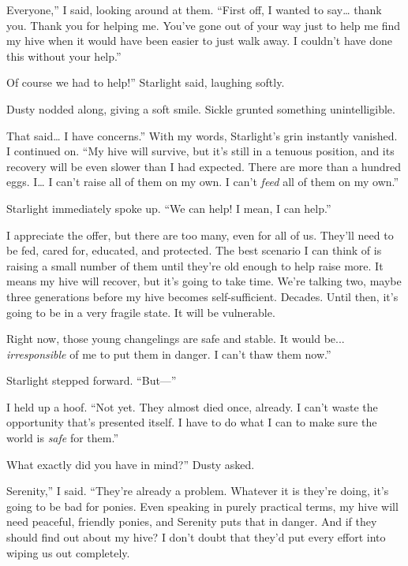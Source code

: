 \leavevmode{}Everyone,” I said, looking around at them. “First off, I wanted to say… thank you. Thank you for helping me. You’ve gone out of your way just to help me find my hive when it would have been easier to just walk away. I couldn’t have done this without your help.”

\leavevmode{}Of course we had to help!” Starlight said, laughing softly.

Dusty nodded along, giving a soft smile. Sickle grunted something unintelligible.

\leavevmode{}That said… I have concerns.” With my words, Starlight’s grin instantly vanished. I continued on. “My hive will survive, but it’s still in a tenuous position, and its recovery will be even slower than I had expected. There are more than a hundred eggs. I… I can’t raise all of them on my own. I can’t \textit{feed} all of them on my own.”

Starlight immediately spoke up. “We can help! I mean, I can help.”

\leavevmode{}I appreciate the offer, but there are too many, even for all of us. They’ll need to be fed, cared for, educated, and protected. The best scenario I can think of is raising a small number of them until they’re old enough to help raise more. It means my hive will recover, but it’s going to take time. We’re talking two, maybe three generations before my hive becomes self-sufficient. Decades. Until then, it’s going to be in a very fragile state. It will be vulnerable.

\leavevmode{}Right now, those young changelings are safe and stable. It would be... \textit{irresponsible} of me to put them in danger. I can’t thaw them now.”

Starlight stepped forward. “But—”

I held up a hoof. “Not yet. They almost died once, already. I can’t waste the opportunity that’s presented itself. I have to do what I can to make sure the world is \textit{safe} for them.”

\leavevmode{}What exactly did you have in mind?” Dusty asked.

\leavevmode{}Serenity,” I said. “They’re already a problem. Whatever it is they’re doing, it’s going to be bad for ponies. Even speaking in purely practical terms, my hive will need peaceful, friendly ponies, and Serenity puts that in danger. And if they should find out about my hive? I don’t doubt that they’d put every effort into wiping us out completely.

